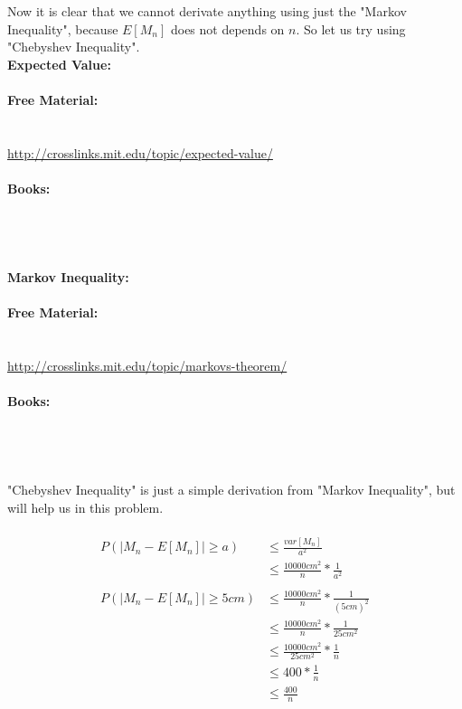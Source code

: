 \documentclass[10pt,a4paper]{article}
\begin{document}
	Now it is clear that we cannot derivate anything using just the "Markov Inequality", because $E[M_n]$ does not depends on $n$. So let us try using "Chebyshev Inequality".\\
	\newpage
	\textbf{Expected Value:}\\
	\\
	\textbf{Free Material:}\\
	\\
	\cite[section 18.4, page 751]{MIT6042}\\
	\url{http://crosslinks.mit.edu/topic/expected-value/}\\
	\\
	\textbf{Books:}\\
	\\
	\cite[section 2.4, page 81]{dimitriIntro}\\
	\cite[section 4.4, page 128]{sheldonrossIntroProb}\\
	\\
	\textbf{Markov Inequality:}\\
	\\
	\textbf{Free Material:}\\
	\\
	\cite[section 19.1, page 789]{MIT6042}\\
	\url{http://crosslinks.mit.edu/topic/markovs-theorem/}\\
	\\
	\textbf{Books:}\\
	\\
	\cite[section 5.1, page 265]{dimitriIntro}\\
	\cite[section 8.2, page 388]{sheldonrossIntroProb}\\
	\\	
	"Chebyshev Inequality" is just a simple derivation from "Markov Inequality", but will help us in this problem.\\
	\\
	\begin{align*}
	P(|M_n - E[M_n]| \ge a) &\le \frac{var[M_n]}{a^2}\\
	& \le \frac{10000cm^2}{n} * \frac{1}{a^2}\\
	\\
	P(|M_n - E[M_n]| \ge 5cm) &\le \frac{10000cm^2}{n} * \frac{1}{(5cm)^2}\\
	&\le \frac{10000cm^2}{n} * \frac{1}{25cm^2}\\
	&\le \frac{10000cm^2}{25cm^2} * \frac{1}{n}\\
	&\le 400 * \frac{1}{n}\\	
	&\le \frac{400}{n}\\		
	\end{align*}
	
\end{document}
